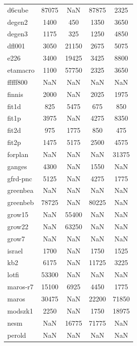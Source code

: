 \begin{longtable}{lcccc}
d6cube   &    87075 &   NaN &    87875 &     2325 \\
degen2   &     1400 &   450 &     1350 &     3650 \\
degen3   &     1175 &   325 &     1250 &     4850 \\
dfl001   &     3050 & 21150 &     2675 &     5075 \\
e226     &     3400 & 19425 &     3425 &     8800 \\
etamacro &     1100 & 57750 &     2325 &     3650 \\
fffff800 &      NaN &   NaN &      NaN &      NaN \\
finnis   &     2000 &   NaN &     2025 &     1975 \\
fit1d    &      825 &  5475 &      675 &      850 \\
fit1p    &     3975 &   NaN &     4275 &     8350 \\
fit2d    &      975 &  1775 &      850 &      475 \\
fit2p    &     1475 &  5175 &     2500 &     4575 \\
forplan  &      NaN &   NaN &      NaN &    31375 \\
ganges   &     4300 &   NaN &     1550 &      NaN \\
gfrd-pnc &     5125 &   NaN &     4275 &     1775 \\
greenbea &      NaN &   NaN &      NaN &      NaN \\
greenbeb &    78725 &   NaN &    80225 &      NaN \\
grow15   &      NaN & 55400 &      NaN &      NaN \\
grow22   &      NaN & 63250 &      NaN &      NaN \\
grow7    &      NaN &   NaN &      NaN &      NaN \\
israel   &     1700 &   NaN &     1750 &     1525 \\
kb2      &     6175 &   NaN &    11725 &     3225 \\
lotfi    &    53300 &   NaN &      NaN &      NaN \\
maros-r7 &    15100 &  6925 &     4450 &     1775 \\
maros    &    30475 &   NaN &    22200 &    71850 \\
modszk1  &     2250 &   NaN &     1750 &    18975 \\
nesm     &      NaN & 16775 &    71775 &      NaN \\
perold   &      NaN &   NaN &      NaN &      NaN \\

\end{longtable}
